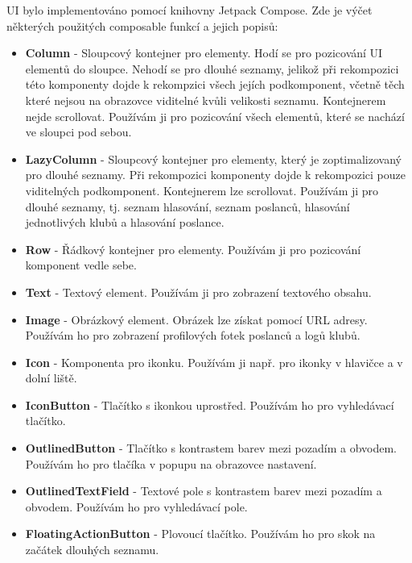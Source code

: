 UI bylo implementováno pomocí knihovny Jetpack Compose. Zde je výčet některých použitých composable funkcí a jejich popisů:


\begin{itemize}
	\item \textbf{Column} - Sloupcový kontejner pro elementy. Hodí se pro pozicování UI elementů do sloupce. Nehodí se pro dlouhé seznamy, jelikož při rekompozici této komponenty dojde k rekompzici všech jejích podkomponent, včetně těch které nejsou na obrazovce viditelné kvůli velikosti seznamu. Kontejnerem nejde scrollovat. Používám ji pro pozicování všech elementů, které se nachází ve sloupci pod sebou.

	\item \textbf{LazyColumn} - Sloupcový kontejner pro elementy, který je zoptimalizovaný pro dlouhé seznamy. Při rekompozici komponenty dojde k rekompozici pouze viditelných podkomponent. Kontejnerem lze scrollovat. Používám ji pro dlouhé seznamy, tj. seznam hlasování, seznam poslanců, hlasování jednotlivých klubů a hlasování poslance.

	\item \textbf{Row} - Řádkový kontejner pro elementy. Používám ji pro pozicování komponent vedle sebe.

	\item \textbf{Text} - Textový element. Používám ji pro zobrazení textového obsahu.

	\item \textbf{Image} - Obrázkový element. Obrázek lze získat pomocí URL adresy. Používám ho pro zobrazení profilových fotek poslanců a logů klubů.

	\item \textbf{Icon} - Komponenta pro ikonku. Používám ji např. pro ikonky v hlavičce a v dolní liště.

	\item \textbf{IconButton} - Tlačítko s ikonkou uprostřed. Používám ho pro vyhledávací tlačítko.

	\item \textbf{OutlinedButton} - Tlačítko s kontrastem barev mezi pozadím a obvodem. Používám ho pro tlačíka v popupu na obrazovce nastavení.

	\item \textbf{OutlinedTextField} - Textové pole s kontrastem barev mezi pozadím a obvodem. Používám ho pro vyhledávací pole.

	\item \textbf{FloatingActionButton} - Plovoucí tlačítko. Používám ho pro skok na začátek dlouhých seznamu.


\end{itemize}
